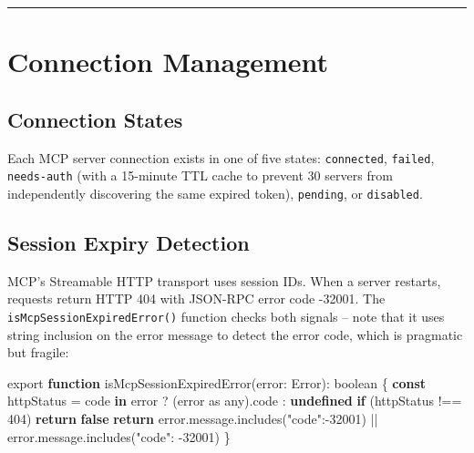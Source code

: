 \documentclass[
  english,
  11pt,
  letterpaper,
]{book}
\newenvironment{Shaded}{\begin{snugshade}}{\end{snugshade}}
\newcommand{\AttributeTok}[1]{\textcolor[rgb]{0.40,0.45,0.13}{#1}}
\newcommand{\BuiltInTok}[1]{\textcolor[rgb]{0.00,0.23,0.31}{#1}}
\newcommand{\ControlFlowTok}[1]{\textcolor[rgb]{0.00,0.23,0.31}{\textbf{#1}}}
\newcommand{\DataTypeTok}[1]{\textcolor[rgb]{0.68,0.00,0.00}{#1}}
\newcommand{\DecValTok}[1]{\textcolor[rgb]{0.68,0.00,0.00}{#1}}
\newcommand{\FunctionTok}[1]{\textcolor[rgb]{0.28,0.35,0.67}{#1}}
\newcommand{\ImportTok}[1]{\textcolor[rgb]{0.00,0.46,0.62}{#1}}
\newcommand{\KeywordTok}[1]{\textcolor[rgb]{0.00,0.23,0.31}{\textbf{#1}}}
\newcommand{\NormalTok}[1]{\textcolor[rgb]{0.00,0.23,0.31}{#1}}
\newcommand{\OperatorTok}[1]{\textcolor[rgb]{0.37,0.37,0.37}{#1}}
\newcommand{\StringTok}[1]{\textcolor[rgb]{0.13,0.47,0.30}{#1}}
\begin{document}
\begin{center}\rule{0.5\linewidth}{0.5pt}\end{center}

\section{Connection Management}\label{connection-management}

\subsection{Connection States}\label{connection-states}

Each MCP server connection exists in one of five states:
\texttt{connected}, \texttt{failed}, \texttt{needs-auth} (with a
15-minute TTL cache to prevent 30 servers from independently discovering
the same expired token), \texttt{pending}, or \texttt{disabled}.

\subsection{Session Expiry Detection}\label{session-expiry-detection}

MCP's Streamable HTTP transport uses session IDs. When a server
restarts, requests return HTTP 404 with JSON-RPC error code -32001. The
\texttt{isMcpSessionExpiredError()} function checks both signals -- note
that it uses string inclusion on the error message to detect the error
code, which is pragmatic but fragile:

\begin{Shaded}
\begin{Highlighting}[]
\ImportTok{export} \KeywordTok{function} \FunctionTok{isMcpSessionExpiredError}\NormalTok{(error}\OperatorTok{:} \BuiltInTok{Error}\NormalTok{)}\OperatorTok{:} \DataTypeTok{boolean}\NormalTok{ \{}
  \KeywordTok{const}\NormalTok{ httpStatus }\OperatorTok{=} \StringTok{\textquotesingle{}code\textquotesingle{}} \KeywordTok{in}\NormalTok{ error }\OperatorTok{?}\NormalTok{ (error }\ImportTok{as} \DataTypeTok{any}\NormalTok{)}\OperatorTok{.}\AttributeTok{code} \OperatorTok{:} \KeywordTok{undefined}
  \ControlFlowTok{if}\NormalTok{ (httpStatus }\OperatorTok{!==} \DecValTok{404}\NormalTok{) }\ControlFlowTok{return} \KeywordTok{false}
  \ControlFlowTok{return}\NormalTok{ error}\OperatorTok{.}\AttributeTok{message}\OperatorTok{.}\FunctionTok{includes}\NormalTok{(}\StringTok{\textquotesingle{}"code":{-}32001\textquotesingle{}}\NormalTok{) }\OperatorTok{||}
\NormalTok{    error}\OperatorTok{.}\AttributeTok{message}\OperatorTok{.}\FunctionTok{includes}\NormalTok{(}\StringTok{\textquotesingle{}"code": {-}32001\textquotesingle{}}\NormalTok{)}
\NormalTok{\}}
\end{Highlighting}
\end{Shaded}
\end{document}
